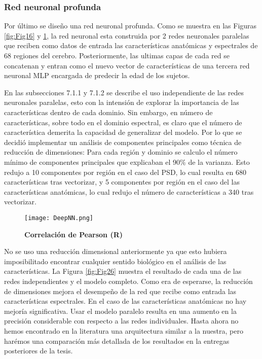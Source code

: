 \documentclass[11pt,letterpaper]{article}
\numberwithin{equation}{subsection}
\numberwithin{table}{subsection}
\begin{document}
\subsubsection{Red neuronal profunda}

\bigskip
\noindent Por último se diseño una red neuronal profunda. Como se muestra en las Figuras \ref{fig:Fig16} y \ref{fig:Fig25}, la red neuronal esta construida por 2 redes neuronales paralelas que reciben como datos de entrada las características anatómicas y espectrales de 68 regiones del cerebro. Posteriormente, las ultimas capas de cada red se concatenan y entran como el nuevo vector de características de una tercera red neuronal MLP encargada de predecir la edad de los sujetos.

\bigskip
\noindent En las subsecciones 7.1.1 y 7.1.2 se describe el uso independiente de las redes neuronales paralelas, esto con la intensión de explorar la importancia de las características dentro de cada dominio. Sin embargo, en número de características, sobre todo en el dominio espectral, es claro que el número de característica demerita la capacidad de generalizar del modelo. Por lo que se decidió implementar un análisis de componentes principales como técnica de reducción de dimensiones: Para cada región y dominio se calculo el número mínimo de componentes principales que explicaban el 90\% de la varianza. Esto redujo a 10 componentes por región en el caso del PSD, lo cual resulta en 680 características tras vectorizar, y 5 componentes por región en el caso del las características anatómicas, lo cual redujo el número de características a 340 tras vectorizar.


\begin{figure}[H]
\centering
	\texttt{[image: DeepNN.png]}
	\captionsetup{labelfont=bf}
	\caption{\scriptsize \textbf {Correlación de Pearson (R)} }
	\label{fig:Fig25}
\end{figure} 

\bigskip
\noindent No se uso una reducción dimensional anteriormente ya que esto hubiera imposibilitado encontrar cualquier sentido biológico en el análisis de las características. La Figura \ref{fig:Fig26} muestra el resultado de cada una de las redes independientes y el modelo completo. Como era de esperarse, la reducción de dimensiones mejora el desempeño de la red que recibe como entrada las características espectrales. En el caso de las características anatómicas no hay mejoría significativa. Usar el modelo paralelo resulta en una aumento en la precisión considerable con respecto a las redes individuales. Hasta ahora no hemos encontrado en la literatura una arquitectura similar a la nuestra, pero harémos una comparación más detallada de los resultados en la entregas posteriores de la tesis.
\end{document}
